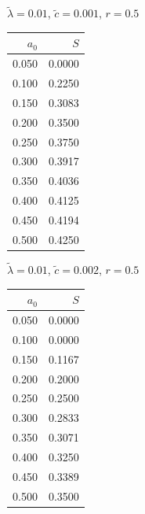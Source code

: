 \documentclass[11pt,a4paper]{article}
\begin{document}
\begin{minipage}[t]{\textwidth}
    \begin{minipage}[t]{0.32\textwidth}
        \footnotesize
        \begin{flushleft}$\tilde{\lambda}=0.01$, $\tilde{c}=0.001$, $r=0.5$\end{flushleft}
        \begin{tabular}[t]{rr}
            $a_0$ & $S$ \\
            \hline
             0.050 & 0.0000 \\
             0.100 & 0.2250 \\
             0.150 & 0.3083 \\
             0.200 & 0.3500 \\
             0.250 & 0.3750 \\
             0.300 & 0.3917 \\
             0.350 & 0.4036 \\
             0.400 & 0.4125 \\
             0.450 & 0.4194 \\
             0.500 & 0.4250 \\
        \end{tabular}
    \end{minipage}
    \begin{minipage}[t]{0.32\textwidth}
        \footnotesize
        \begin{flushleft}$\tilde{\lambda}=0.01$, $\tilde{c}=0.002$, $r=0.5$\end{flushleft}
        \begin{tabular}[t]{rr}
            $a_0$ & $S$ \\
            \hline
             0.050 & 0.0000 \\
             0.100 & 0.0000 \\
             0.150 & 0.1167 \\
             0.200 & 0.2000 \\
             0.250 & 0.2500 \\
             0.300 & 0.2833 \\
             0.350 & 0.3071 \\
             0.400 & 0.3250 \\
             0.450 & 0.3389 \\
             0.500 & 0.3500 \\
        \end{tabular}
    \end{minipage}
    \begin{minipage}[t]{0.32\textwidth}

\end{minipage}
\end{minipage}
\end{document}
